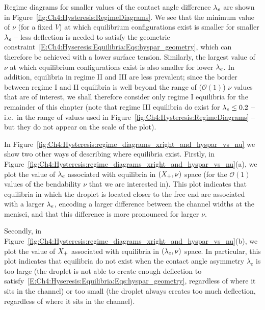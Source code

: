 
Regime diagrams for smaller values of the contact angle difference $\lambda_e$ are shown in Figure~\ref{fig:Ch4:Hysteresis:RegimeDiagrams}. We see that the minimum value of $\nu$ (for a fixed $V$) at which equilibrium configurations exist is smaller for smaller $\lambda_e$ -- less deflection is needed to satisfy the geometric constraint~\eqref{E:Ch4:Hyseresis:Equilibria:Eqs:hyspar_geometry}, which can therefore be achieved with a lower surface tension. Similarly, the largest value of $\nu$ at which equilibrium configurations exist is also smaller for lower $\lambda_e$.  In addition, equilibria in regime II and III are less prevalent; since the border between regime I and II equilibria is well beyond the range of ($\mathcal{O}(1)$) $\nu$ values that are of interest, we shall therefore consider only regime I equilibria for the remainder of this chapter (note that regime III equilibria do exist for $\lambda_e \leq 0.2$ -- i.e.~in the range of values used in Figure~\ref{fig:Ch4:Hysteresis:RegimeDiagrams} -- but they do not appear on the scale of the plot).

In Figure~\ref{fig:Ch4:Hysteresis:regime_diagrams_xright_and_hyspar_vs_nu} we show two other ways of describing where equilibria exist. Firstly, in Figure~\ref{fig:Ch4:Hysteresis:regime_diagrams_xright_and_hyspar_vs_nu}(a), we plot the value of $\lambda_e$ associated with equilibria in $(X_{+}, \nu)$ space (for the $\mathcal{O}(1)$ values of the bendability $\nu$ that we are interested in). This plot indicates that equilibria in which the droplet is located closer to the free end are associated with a larger $\lambda_e$, encoding a larger difference between the channel widths at the menisci, and that this difference is more pronounced for larger $\nu$.

Secondly, in Figure~\ref{fig:Ch4:Hysteresis:regime_diagrams_xright_and_hyspar_vs_nu}(b), we plot the value of $X_{+}$ associated with equilibria in $(\lambda_e, \nu)$ space. In particular, this plot indicates that equilibria do not exist when the contact angle asymmetry $\lambda_e$ is too large (the droplet is not able to create enough deflection to satisfy~\eqref{E:Ch4:Hyseresis:Equilibria:Eqs:hyspar_geometry}, regardless of where it sits in the channel) or too small (the droplet always creates too much deflection, regardless of where it sits in the channel).

